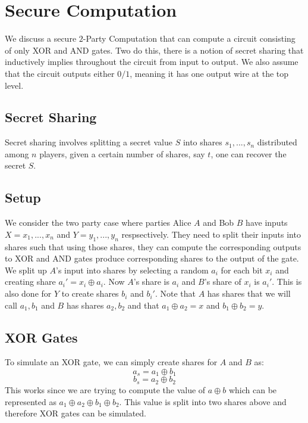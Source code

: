 \documentclass[11pt]{article}
\begin{document}
\section{Secure Computation}
We discuss a secure $2$-Party Computation that can compute a circuit consisting of only XOR and AND gates. Two do this, there is a notion of secret sharing that inductively implies throughout the circuit from input to output. We also assume that the circuit outputs either $0/1$, meaning it has one output wire at the top level.
\subsection{Secret Sharing}

Secret sharing involves splitting a secret value $S$ into shares $s_1,...,s_n$ distributed among $n$ players, given a certain number of shares, say $t$, one can recover the secret $S$.

\subsection{Setup}
We consider the two party case where parties Alice $A$ and Bob $B$ have inputs $X=x_1,...,x_n$ and $Y=y_1,...,y_n$ respsectively. They need to split their inputs into shares such that using those shares, they can compute the corresponding outputs to XOR and AND gates produce corresponding shares to the output of the gate. We split up $A$'s input into shares by selecting a random $a_i$ for each bit $x_i$ and creating share $a_i' = x_i \oplus a_i$. Now $A$'s share is $a_i$ and $B$'s share of $x_i$ is $a_i'$. This is also done for $Y$ to create shares $b_i$ and $b_i'$. Note that $A$ has shares that we will call $a_1, b_1$ and $B$ has shares $a_2, b_2$ and that $a_1 \oplus a_2 = x$ and $b_1 \oplus b_2 = y$.

\subsection{XOR Gates}
To simulate an XOR gate, we can simply create shares for $A$ and $B$ as:
$$a_s = a_1 \oplus b_1$$
$$b_s = a_2 \oplus b_2$$
This works since we are trying to compute the value of $a \oplus b$ which can be represented as $a_1 \oplus a_2 \oplus b_1 \oplus b_2$. This value is split into two shares above and therefore XOR gates can be simulated.
\end{document}
